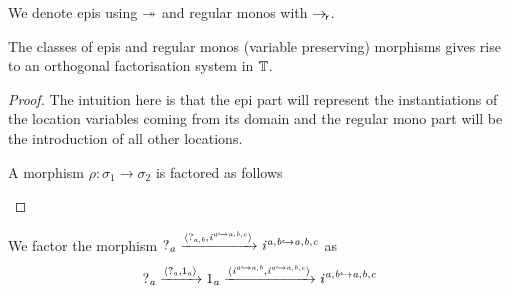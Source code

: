 \begin{notation}
    We denote epis using $\twoheadrightarrow$ and regular monos with $\to_{\hspace{-1pt}\mathsf{r}}$.
\end{notation}

\begin{lemma}
    The classes of epis and regular monos (variable preserving) morphisms gives rise to an orthogonal factorisation system in $\mathbb{T}$.
\end{lemma}
\begin{proof}
The intuition here is that the epi part will represent the instantiations of the location variables coming from its domain
and the regular mono part will be the introduction of all other locations.

A morphism $\rho : \sigma_1 \to \sigma_2$ is factored as follows
\begin{center}
\end{center}
\end{proof}
\begin{example}
    We factor the morphism $?_{\mathit{a}} \xrightarrow{\langle?_{\mathit{a},\mathit{b}}, \mathit{i}^{\mathit{a} \hookrightarrow \mathit{a},\mathit{b},\mathit{c}}\rangle} \mathit{i}^{\mathit{a},\mathit{b} \hookrightarrow \mathit{a},\mathit{b},\mathit{c}}$ as
    \[ ?_{\mathit{a}} \xrightarrow{\langle?_{\mathit{a}}, 1_{\mathit{a}}\rangle} 1_{\mathit{a}} \xrightarrow{\langle\mathit{i}^{\mathit{a} \hookrightarrow \mathit{a},\mathit{b}}, \mathit{i}^{\mathit{a} \hookrightarrow \mathit{a},\mathit{b},\mathit{c}}\rangle} \mathit{i}^{\mathit{a},\mathit{b} \hookrightarrow \mathit{a},\mathit{b},\mathit{c}} \]
\end{example}
